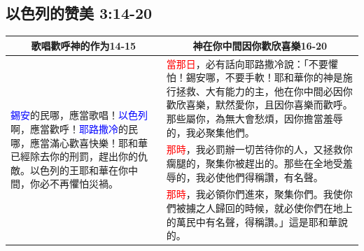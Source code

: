 \subsection{以色列的赞美 3:14-20}
\begin{table}[H]
\begin{tabular}{p{4.25cm}|p{}}\hline\hline
\multicolumn{1}{c|}{歌唱歡呼神的作为14-15}&\multicolumn{1}{c}{神在你中間因你歡欣喜樂16-20}\\\hline
\multirow{3}{4.5cm}{\textcolor{blue}{錫安}的民哪，應當歌唱！\textcolor{blue}{以色列}啊，應當歡呼！\textcolor{blue}{耶路撒冷}的民哪，應當滿心歡喜快樂！耶和華已經除去你的刑罰，趕出你的仇敵。以色列的王耶和華在你中間，你必不再懼怕災禍。}
&\textcolor{red}{當那日}，必有話向耶路撒冷說：「不要懼怕！錫安哪，不要手軟！耶和華你的神是施行拯救、大有能力的主，他在你中間必因你歡欣喜樂，默然愛你，且因你喜樂而歡呼。那些屬你，為無大會愁煩，因你擔當羞辱的，我必聚集他們。\\\cline{2-2}
&\textcolor{red}{那時}，我必罰辦一切苦待你的人，又拯救你瘸腿的，聚集你被趕出的。那些在全地受羞辱的，我必使他們得稱讚，有名聲。\\\cline{2-2}
&\textcolor{red}{那時}，我必領你們進來，聚集你們。我使你們被擄之人歸回的時候，就必使你們在地上的萬民中有名聲，得稱讚。」這是耶和華說的。\\\hline
\end{tabular}
\end{table}












